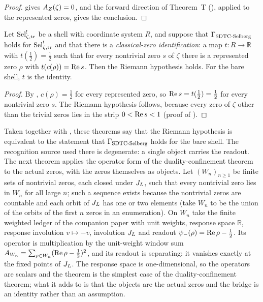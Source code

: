 \begin{proof}
 gives \(A_{Z}(\zeta)=0\), and the forward
direction of Theorem~T (), applied
to the represented zeros, gives the conclusion.
\end{proof}

\begin{theorem}
\label{thm:rh:full-classical}
Let \(\mathrm{Sel}^{!}_{\zeta,\mathrm{tr}}\) be a shell with coordinate system \(R\), and suppose that
\(\Gamma_{\mathrm{SDTC\text{-}Selberg}}\) holds for \(\mathrm{Sel}^{!}_{\zeta,\mathrm{tr}}\) and that there is a
\emph{classical-zero identification}: a map \(t:R\to\mathbb R\) with \(t(\frac12)=\frac12\)
such that for every nontrivial zero \(s\) of \(\zeta\) there is a
represented zero \(\rho\) with \(t(c(\rho))=\operatorname{Re} s\).
Then the Riemann hypothesis holds.  For the bare shell, \(t\) is the
identity.
\end{theorem}

\begin{proof}
By , \(c(\rho)=\frac12\) for every
represented zero, so \(\operatorname{Re} s=t(\frac12)=\frac12\) for every nontrivial
zero \(s\).  The Riemann hypothesis follows, because every zero of \(\zeta\) other
than the trivial zeros lies in the strip \(0<\operatorname{Re} s<1\) (proof of
).
\end{proof}

Taken together with , these theorems
say that the Riemann hypothesis is equivalent to the statement that \(\Gamma_{\mathrm{SDTC\text{-}Selberg}}\) holds for the bare shell.  The recognition source
used there is degenerate: a single object carries the readout.  The
next theorem applies the operator form of the duality-confinement
theorem to the actual zeros, with the zeros themselves as objects.
  Let
\((W_n)_{n\geq1}\) be finite sets of nontrivial zeros, each closed under
\(J_{L}\), such that every nontrivial zero lies in \(W_n\) for all large
\(n\); such a sequence exists because the nontrivial zeros are countable and
each orbit of \(J_{L}\) has one or two elements (take \(W_n\) to be the
union of the orbits of the first \(n\) zeros in an enumeration).  On
\(W_n\) take the finite weighted ledger of the companion
paper with unit weights, response space \(\mathbb R\), response
involution \(v\mapsto-v\), involution \(J_{L}\) and readout
\(\psi_{-}(\rho)=\operatorname{Re}\rho-\frac12\).  Its operator is multiplication by the unit-weight window sum
\(A_{W_n}=\sum_{\rho\in W_n}(\operatorname{Re}\rho-\frac12)^2\), and its readout is
separating: it vanishes exactly at the fixed points of \(J_{L}\).  The
response space is one-dimensional, so the operators are scalars and the
theorem is the simplest case of the duality-confinement theorem; what
it adds to  is that the objects are the
actual zeros and the bridge is an identity rather than an
assumption.

